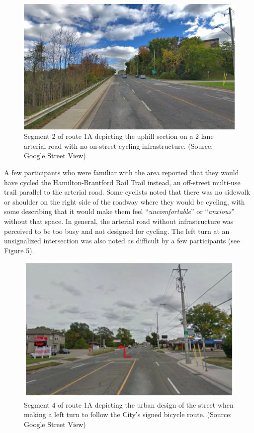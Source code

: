 \documentclass[]{elsarticle} %
\begin{document}
\begin{figure}

{\centering \includegraphics[width=0.65\linewidth]{Figure 4} 

}

\caption{Segment 2 of route 1A depicting the uphill section on a 2 lane arterial road with no on-street cycling infrastructure. (Source: Google Street View)}\label{fig:figure-4}
\end{figure}

A few participants who were familiar with the area reported that they
would have cycled the Hamilton-Brantford Rail Trail instead, an
off-street multi-use trail parallel to the arterial road. Some cyclists
noted that there was no sidewalk or shoulder on the right side of the
roadway where they would be cycling, with some describing that it would
make them feel ``\emph{uncomfortable}'' or ``\emph{anxious}'' without
that space. In general, the arterial road without infrastructure was
perceived to be too busy and not designed for cycling. The left turn at
an unsignalized intersection was also noted as difficult by a few
participants (see Figure 5).

\begin{figure}

{\centering \includegraphics[width=0.65\linewidth]{Figure 5} 

}

\caption{Segment 4 of route 1A depicting the urban design of the street when making a left turn to follow the City's signed bicycle route. (Source: Google Street View)}\label{fig:figure-5}
\end{figure}
\end{document}
